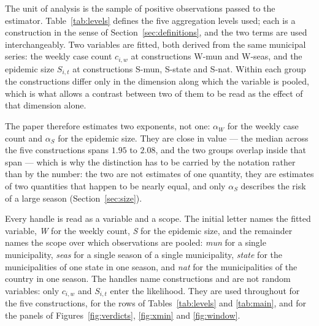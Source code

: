 \documentclass[english,10pt,b5paper]{article}
\newcommand{\lvl}[1]{\mbox{#1}}
\begin{document}
The unit of analysis is the sample of positive observations passed to the
estimator. Table~\ref{tab:levels} defines the five aggregation levels used;
each is a construction in the sense of Section~\ref{sec:definitions}, and the
two terms are used interchangeably. Two variables are fitted, both derived
from the same municipal series: the weekly case count $c_{i,w}$ at
constructions \lvl{W-mun} and \lvl{W-seas}, and the epidemic size $S_{i,t}$ at
constructions \lvl{S-mun}, \lvl{S-state} and \lvl{S-nat}. Within each group
the constructions differ only in the dimension along which the variable is
pooled, which is what allows a contrast between two of them to be read as the
effect of that dimension alone.

The paper therefore estimates two exponents, not one: $\alpha_W$ for the
weekly case count and $\alpha_S$ for the epidemic size. They are close in
value --- the median across the five constructions spans $1.95$ to $2.08$, and
the two groups overlap inside that span --- which is why the distinction has
to be carried by the notation rather than by the number: the two are not
estimates of one quantity, they are estimates of two quantities that happen to
be nearly equal, and only $\alpha_S$ describes the risk of a large season
(Section~\ref{sec:size}).

Every handle is read as a variable and a scope. The initial letter names the
fitted variable, \emph{W} for the weekly count, \emph{S} for the epidemic
size, and the remainder names the scope over which observations are pooled:
\emph{mun} for a single municipality, \emph{seas} for a single season of a
single municipality, \emph{state} for the municipalities of one state in one
season, and \emph{nat} for the municipalities of the country in one season.
The handles name constructions and are not random variables: only $c_{i,w}$
and $S_{i,t}$ enter the likelihood. They are used throughout for the five
constructions, for the rows of Tables~\ref{tab:levels} and \ref{tab:main}, and
for the panels of Figures~\ref{fig:verdicts}, \ref{fig:xmin} and
\ref{fig:window}.
\end{document}
